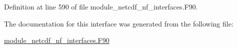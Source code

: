 Definition at line 590 of file module\+\_\+netcdf\+\_\+nf\+\_\+interfaces.\+F90.



The documentation for this interface was generated from the following file\+:\begin{DoxyCompactItemize}
\item 
\hyperlink{module__netcdf__nf__interfaces_8F90}{module\+\_\+netcdf\+\_\+nf\+\_\+interfaces.\+F90}\end{DoxyCompactItemize}

